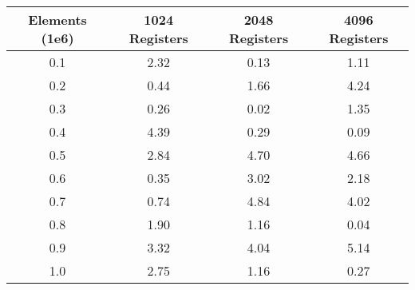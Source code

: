 \begin{tabular}{cccc}
Elements (1e6) & 1024 Registers & 2048 Registers & 4096 Registers\\\hline
0.1 & 2.32 & 0.13 & 1.11\\
0.2 & 0.44 & 1.66 & 4.24\\
0.3 & 0.26 & 0.02 & 1.35\\
0.4 & 4.39 & 0.29 & 0.09\\
0.5 & 2.84 & 4.70 & 4.66\\
0.6 & 0.35 & 3.02 & 2.18\\
0.7 & 0.74 & 4.84 & 4.02\\
0.8 & 1.90 & 1.16 & 0.04\\
0.9 & 3.32 & 4.04 & 5.14\\
1.0 & 2.75 & 1.16 & 0.27\\
\end{tabular}

